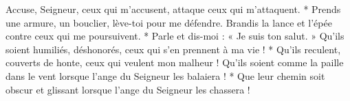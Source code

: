 Accuse, Seigneur, ceux qui m'accusent, attaque ceux qui m'attaquent. *
\versseparator
Prends une armure, un bouclier, lève-toi pour me défendre.
\versseparator
Brandis la lance et l'épée contre ceux qui me poursuivent. * Parle et dis-moi : « Je suis ton salut. »
\versseparator
Qu'ils soient humiliés, déshonorés, ceux qui s'en prennent à ma vie ! * Qu'ils reculent, couverts de honte, ceux qui veulent mon malheur !
\versseparator
Qu'ils soient comme la paille dans le vent lorsque l'ange du Seigneur les balaiera ! *
\versseparator
Que leur chemin soit obscur et glissant lorsque l'ange du Seigneur les chassera !
